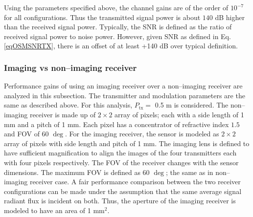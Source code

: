 Using the parameters specified above, the channel gains are of the order of $10^{-7}$ for all configurations. Thus the transmitted signal power is about $140$ dB higher than the received signal power. Typically, the SNR is defined as the ratio of received signal power to noise power. However, given SNR as defined in Eq. \eqref{eqOSMSNRTX}, there is an offset of at least +140 dB over typical definition.

\subsubsection{Imaging vs non--imaging receiver}
\label{subsubsec:osmResultsCompare}
Performance gains of using an imaging receiver over a non--imaging receiver are analyzed in this subsection. The transmitter and modulation parameters are the same as described above. For this analysis, $P_{\text{tx}}=$ 0.5 m is considered. The non--imaging receiver is made up of $2\times2$ array of pixels; each with a side length of 1 mm and a pitch of 1 mm. Each pixel has a concentrator of refractive index $1.5$ and FOV of 60 $\deg$. For the imaging receiver, the sensor is modeled as $2\times2$ array of pixels with side length and pitch of 1 mm. The imaging lens is defined to have sufficient magnification to align the images of the four transmitters each with four pixels respectively. 
The FOV of the receiver changes with the sensor dimensions. The maximum FOV is defined as 60 $\deg$; the same as in non--imaging receiver case. A fair performance comparison between the two receiver configurations can be made under the assumption that the same average signal radiant flux is incident on both. Thus, the aperture of the imaging receiver is modeled to have an area of  1 mm$^{2}$.

